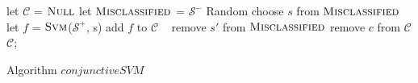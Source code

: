 \begin{algorithm}[!h]
\SetAlgoVlined
\Indm
{}
\Indp
    let $\mathcal{C}$ = $\textsc{Null}$\;
    let $\textsc{Misclassified}$ = $\mathcal{S}^-$\;
     {
        Random choose $s$ from $\textsc{Misclassified}$\;
        let $f$ = $\textsc{Svm}$($\mathcal{S}^+$, s)\;
        add $f$ to $\mathcal{C}$\;
         {\
             {
                remove $s'$ from $\textsc{Misclassified}$\;
            }
        }
     {
         {
            remove $c$ from $\mathcal{C}$\;
        }
    }
    }
    \Return $\mathcal{C}$;
\caption{Algorithm $conjunctiveSVM$}
\label{alg:conjunctiveSVM}
\end{algorithm}






